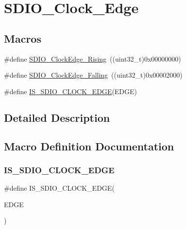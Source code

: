 \hypertarget{group___s_d_i_o___clock___edge}{}\section{S\+D\+I\+O\+\_\+\+Clock\+\_\+\+Edge}
\label{group___s_d_i_o___clock___edge}
\subsection*{Macros}
\begin{DoxyCompactItemize}
\item 
\#define \mbox{\hyperlink{group___s_d_i_o___clock___edge_ga6d0f902037762a3048d95303c0037313}{S\+D\+I\+O\+\_\+\+Clock\+Edge\+\_\+\+Rising}}~((uint32\+\_\+t)0x00000000)
\item 
\#define \mbox{\hyperlink{group___s_d_i_o___clock___edge_ga7be68024e3e2fe1994def85bc944189b}{S\+D\+I\+O\+\_\+\+Clock\+Edge\+\_\+\+Falling}}~((uint32\+\_\+t)0x00002000)
\item 
\#define \mbox{\hyperlink{group___s_d_i_o___clock___edge_ga63420b10a52e3d82a89a45f20dc41786}{I\+S\+\_\+\+S\+D\+I\+O\+\_\+\+C\+L\+O\+C\+K\+\_\+\+E\+D\+GE}}(E\+D\+GE)
\end{DoxyCompactItemize}


\subsection{Detailed Description}


\subsection{Macro Definition Documentation}
\mbox{\label{group___s_d_i_o___clock___edge_ga63420b10a52e3d82a89a45f20dc41786}} 
\subsubsection{\texorpdfstring{IS\_SDIO\_CLOCK\_EDGE}{IS\_SDIO\_CLOCK\_EDGE}}
{\footnotesize\ttfamily \#define I\+S\+\_\+\+S\+D\+I\+O\+\_\+\+C\+L\+O\+C\+K\+\_\+\+E\+D\+GE(\begin{DoxyParamCaption}\item[{}]{E\+D\+GE }\end{DoxyParamCaption})}

